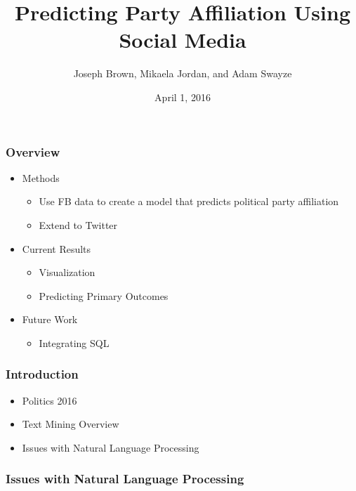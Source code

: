 \documentclass[xcolor=dvipsnames]{beamer}
\title{Predicting Party Affiliation Using Social Media}
\author{Joseph Brown, Mikaela Jordan, and Adam Swayze}
\institute{Tarleton State University}
\date{April 1, 2016}
\begin{document}
\frame{\titlepage}

\begin{frame}
\frametitle{Overview}
\begin{itemize}
\item Methods
\begin{itemize}
\item Use FB data to create a model that predicts political party affiliation
\item Extend to Twitter
\end{itemize}
\item Current Results
\begin{itemize}
\item Visualization
\item Predicting Primary Outcomes
\end{itemize}
\item Future Work
\begin{itemize}
\item Integrating SQL
\end{itemize}
\end{itemize}
\end{frame}

\begin{frame}
\frametitle{Introduction}
\begin{itemize}
\item Politics 2016
\item Text Mining Overview
\item Issues with Natural Language Processing
\end{itemize}
\end{frame}

\begin{frame}
\frametitle{Issues with Natural Language Processing}

\end{frame}
\end{document}
